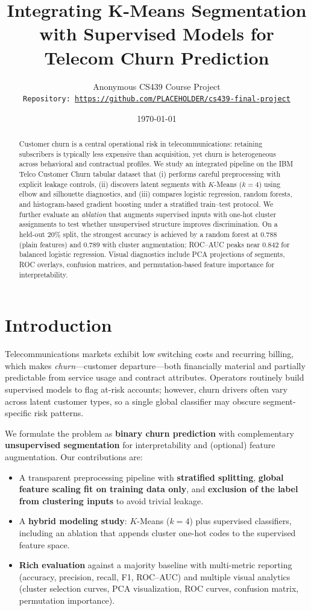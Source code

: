 \documentclass[11pt]{article}
\title{Integrating K-Means Segmentation with Supervised Models for Telecom Churn Prediction}
\author{Anonymous CS439 Course Project\\
\texttt{Repository: \url{https://github.com/PLACEHOLDER/cs439-final-project}}}
\date{\today}
\begin{document}
\maketitle

\begin{abstract}
Customer churn is a central operational risk in telecommunications: retaining subscribers is typically less expensive than acquisition, yet churn is heterogeneous across behavioral and contractual profiles. We study an integrated pipeline on the IBM Telco Customer Churn tabular dataset that (i) performs careful preprocessing with explicit leakage controls, (ii) discovers latent segments with $K$-Means ($k{=}4$) using elbow and silhouette diagnostics, and (iii) compares logistic regression, random forests, and histogram-based gradient boosting under a stratified train--test protocol. We further evaluate an \emph{ablation} that augments supervised inputs with one-hot cluster assignments to test whether unsupervised structure improves discrimination. On a held-out $20\%$ split, the strongest accuracy is achieved by a random forest at $0.788$ (plain features) and $0.789$ with cluster augmentation; ROC--AUC peaks near $0.842$ for balanced logistic regression. Visual diagnostics include PCA projections of segments, ROC overlays, confusion matrices, and permutation-based feature importance for interpretability.
\end{abstract}

\section{Introduction}
Telecommunications markets exhibit low switching costs and recurring billing, which makes \emph{churn}---customer departure---both financially material and partially predictable from service usage and contract attributes. Operators routinely build supervised models to flag at-risk accounts; however, churn drivers often vary across latent customer types, so a single global classifier may obscure segment-specific risk patterns.

We formulate the problem as \textbf{binary churn prediction} with complementary \textbf{unsupervised segmentation} for interpretability and (optional) feature augmentation. Our contributions are:
\begin{itemize}
  \item A transparent preprocessing pipeline with \textbf{stratified splitting}, \textbf{global feature scaling fit on training data only}, and \textbf{exclusion of the label from clustering inputs} to avoid trivial leakage.
  \item A \textbf{hybrid modeling study}: $K$-Means ($k{=}4$) plus supervised classifiers, including an ablation that appends cluster one-hot codes to the supervised feature space.
  \item \textbf{Rich evaluation} against a majority baseline with multi-metric reporting (accuracy, precision, recall, F1, ROC--AUC) and multiple visual analytics (cluster selection curves, PCA visualization, ROC curves, confusion matrix, permutation importance).
\end{itemize}
\end{document}
